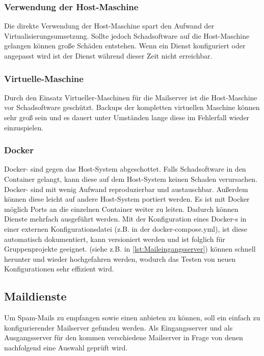 \documentclass[a4paper,11pt,singlespacing]{article}
\begin{document}
		\subsubsection{Verwendung der Host-Maschine}\label{Verwendung der Host-Maschine}
			Die direkte Verwendung der Host-Maschine spart den Aufwand der Virtualisierungsumsetzung.
			Sollte jedoch Schadsoftware auf die Host-Maschine gelangen können gro{\ss}e Schäden entstehen.
			Wenn ein Dienst konfiguriert oder angepasst wird ist der Dienst während dieser Zeit nicht erreichbar.

		\subsubsection{Virtuelle-Maschine}\label{Virtual-Maschine}
			Durch den Einsatz Virtueller-Maschinen für die Mailserver ist die Host-Maschine vor Schadsoftware geschützt.
			Backups der kompletten virtuellen Maschine können sehr groß sein und es dauert unter Umständen lange diese im Fehlerfall wieder einzuspielen.

		\subsubsection{Docker}\label{Docker}
			Docker- sind gegen das Host-System abgeschottet. Falls Schadsoftware in den Container gelangt, kann diese auf dem Host-System keinen Schaden verursachen.
			Docker- sind mit wenig Aufwand reproduzierbar und austauschbar. Au{\ss}erdem können diese leicht auf andere Host-System portiert werden.
			Es ist mit Docker möglich Ports an die einzelnen Container weiter zu leiten. Dadurch können Dienste mehrfach ausgeführt werden.
			Mit der Konfiguration eines Docker-s in einer externen Konfigurationsdatei (z.B. in der docker-compose.yml), ist diese automatisch dokumentiert, kann versioniert werden und ist folglich für Gruppenprojekte geeignet. (siehe z.B. in \autoref{lst:Maileingangsserver})
			 können schnell herunter und wieder hochgefahren werden, wodurch das Testen von neuen Konfigurationen sehr effizient wird.

	\subsection{Maildienste}\label{sec:Mailserver}
		Um Spam-Mails zu empfangen sowie einen  anbieten zu können, soll ein einfach zu konfigurierender Mailserver gefunden werden.
		Als Eingangsserver und als Ausgangsserver für den  kommen verschiedene Mailserver in Frage von denen nachfolgend eine Auswahl geprüft wird.
\end{document}
